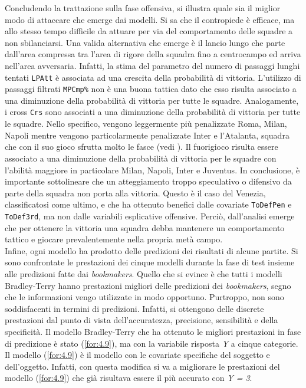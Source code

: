 Concludendo la trattazione sulla fase offensiva, si illustra quale sia il miglior modo di attaccare che emerge dai modelli. Si sa che il contropiede è efficace, ma allo stesso tempo difficile da attuare per via del comportamento delle squadre a non sbilanciarsi. Una valida alternativa che emerge è il lancio lungo che parte dall'area compressa tra l'area di rigore della squadra fino a centrocampo ed arriva nell'area avversaria. Infatti, la stima del parametro del numero di passaggi lunghi tentati \texttt{LPAtt} è associata ad una crescita della probabilità di vittoria. L'utilizzo di passaggi filtrati \texttt{MPCmp\%} non è una buona tattica dato che esso risulta associato a una diminuzione della probabilità di vittoria per tutte le squadre. Analogamente, i cross \texttt{Crs} sono associati a una diminuzione della probabilità di vittoria per tutte le squadre. Nello specifico, vengono leggermente più penalizzate Roma, Milan, Napoli mentre vengono particolarmente penalizzate Inter e l'Atalanta, squadra che con il suo gioco sfrutta molto le fasce (vedi \textit{\cite{ataGioco}}). Il fuorigioco risulta essere associato a una diminuzione della probabilità di vittoria per le squadre con l'abilità maggiore in particolare Milan, Napoli, Inter e Juventus. In conclusione, è importante sottolineare che un atteggiamento troppo speculativo o difensivo da parte della squadra non porta alla vittoria. Questo è il caso del Venezia, classificatosi come ultimo, e che ha ottenuto benefici dalle covariate \texttt{ToDefPen} e \texttt{ToDef3rd}, ma non dalle variabili esplicative offensive. Perciò, dall'analisi emerge che per ottenere la vittoria una squadra debba mantenere un comportamento tattico e giocare prevalentemente nella propria metà campo.\\
Infine, ogni modello ha prodotto delle predizioni dei risultati di alcune partite. Si sono confrontate le prestazioni dei cinque modelli durante la fase di test insieme alle predizioni fatte dai \emph{bookmakers}. Quello che si evince è che tutti i modelli Bradley-Terry hanno prestazioni migliori delle predizioni dei \emph{bookmakers}, segno che le informazioni vengo utilizzate in modo opportuno. Purtroppo, non sono soddisfacenti in termini di predizioni. Infatti, si ottengono delle discrete prestazioni dal punto di vista dell'accuratezza, precisione, sensibilità e della specificità. Il modello Bradley-Terry che ha ottenuto le migliori prestazioni in fase di predizione è stato (\ref{for:4.9}), ma con la variabile risposta \emph{Y} a cinque categorie. Il modello (\ref{for:4.9}) è il modello con le covariate specifiche del soggetto e dell'oggetto. Infatti, con questa modifica si va a migliorare le prestazioni del modello (\ref{for:4.9}) che già risultava essere il più accurato con \emph{Y = 3}.
